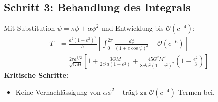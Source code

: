 \subsection*{Schritt 3: Behandlung des Integrals}
Mit Substitution \(\psi = \kappa\phi + \alpha\phi^2\) und Entwicklung bis \(\mathcal{O}(c^{-4})\):
\begin{align}
T &= \frac{a^2(1-e^2)^2}{h} \left[ \int_0^{2\pi} \frac{d\phi}{(1 + e\cos\psi)^2} + \mathcal{O}(c^{-6}) \right] \\
  &= \frac{2\pi a^{3/2}}{\sqrt{GM}} \left[1 + \frac{3GM}{2c^2a(1-e^2)} + \frac{45G^2M^2}{8c^4a^2(1-e^2)^2}\left(1 - \frac{e^2}{3}\right)\right] \label{eq:T_final}
\end{align}
\textbf{Kritische Schritte:}
\begin{itemize}
\item Keine Vernachlässigung von \(\alpha\phi^2\) – trägt zu \(\mathcal{O}(c^{-4})\)-Termen bei.
\end{itemize}
